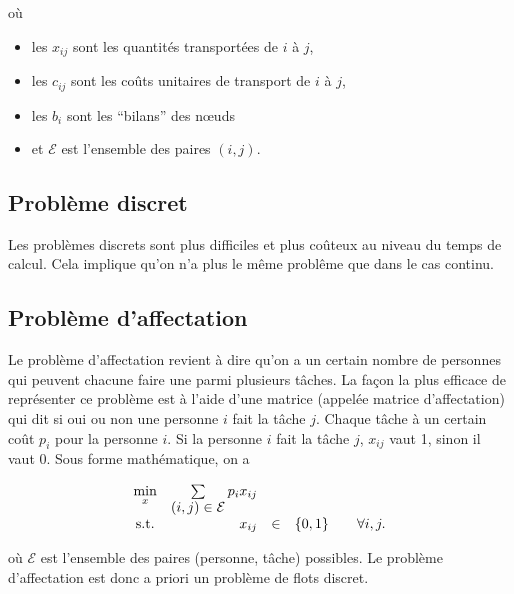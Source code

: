 	où

	\begin{itemize}
		\item les $x_{ij}$ sont les quantités transportées de $i$ à $j$,
		\item les $c_{ij}$ sont les coûts unitaires de transport
		de $i$ à $j$,
		\item les $b_i$ sont les ``bilans'' des n\oe{}uds
		\item et $\mathcal{E}$ est l'ensemble des paires $(i,j)$.
	\end{itemize}

\subsection{Problème discret}

Les problèmes discrets sont plus difficiles et plus coûteux
au niveau du temps de calcul.
Cela implique qu'on n'a plus le même problême que dans le cas continu.

\subsection{Problème d'affectation}

\begin{center}
\end{center}

Le problème d'affectation revient à dire
qu'on a un certain nombre de personnes
qui peuvent chacune faire une parmi plusieurs tâches.
La façon la plus efficace de représenter ce problème est à l'aide d'une matrice
(appelée matrice d'affectation) qui dit si oui ou non une personne $i$
fait la tâche $j$.
Chaque tâche à un certain coût $p_i$ pour la personne $i$.
Si la personne $i$ fait la tâche $j$, $x_{ij}$ vaut 1,
sinon il vaut 0.
Sous forme mathématique, on a


\begin{equation*}
\begin{array}{c@{\quad} r c l@{\qquad} l}
	\min\limits_{x} & \sum\limits_{{\displaystyle (i,j) \in \mathcal{E}}} p_i x_{ij} &&&\\
	\textnormal{s.t.} & x_{ij} & \in & \{0, 1\} & \forall i,j.
\end{array}
\end{equation*}

où $\mathcal{E}$ est l'ensemble des paires (personne, tâche) possibles.
Le problème d'affectation est donc a priori un problème de flots discret.
